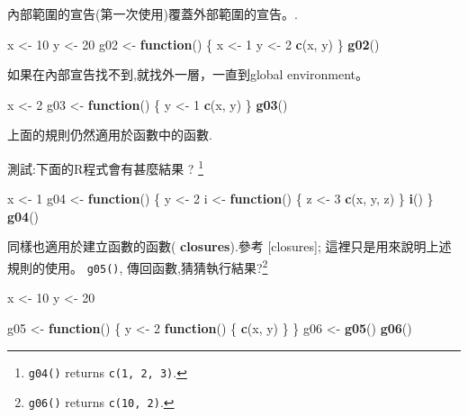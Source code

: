 \documentclass[]{book}
\newenvironment{Shaded}{\begin{snugshade}}{\end{snugshade}}
\newcommand{\ControlFlowTok}[1]{\textcolor[rgb]{0.13,0.29,0.53}{\textbf{#1}}}
\newcommand{\DecValTok}[1]{\textcolor[rgb]{0.00,0.00,0.81}{#1}}
\newcommand{\KeywordTok}[1]{\textcolor[rgb]{0.13,0.29,0.53}{\textbf{#1}}}
\newcommand{\NormalTok}[1]{#1}
\newcommand{\StringTok}[1]{\textcolor[rgb]{0.31,0.60,0.02}{#1}}
\let\rmarkdownfootnote\footnote%
\def\footnote{\protect\rmarkdownfootnote}
\theoremstyle{definition}
\theoremstyle{definition}
\theoremstyle{definition}
\theoremstyle{remark}
\begin{document}
內部範圍的宣告(第一次使用)覆蓋外部範圍的宣告。.

\begin{Shaded}
\begin{Highlighting}[]
\NormalTok{x <-}\StringTok{ }\DecValTok{10}
\NormalTok{y <-}\StringTok{ }\DecValTok{20}
\NormalTok{g02 <-}\StringTok{ }\ControlFlowTok{function}\NormalTok{() \{}
\NormalTok{  x <-}\StringTok{ }\DecValTok{1}
\NormalTok{  y <-}\StringTok{ }\DecValTok{2}
  \KeywordTok{c}\NormalTok{(x, y)}
\NormalTok{\}}
\KeywordTok{g02}\NormalTok{()}
\end{Highlighting}
\end{Shaded}

如果在內部宣告找不到,就找外一層，一直到global environment。

\begin{Shaded}
\begin{Highlighting}[]
\NormalTok{x <-}\StringTok{ }\DecValTok{2}
\NormalTok{g03 <-}\StringTok{ }\ControlFlowTok{function}\NormalTok{() \{}
\NormalTok{  y <-}\StringTok{ }\DecValTok{1}
  \KeywordTok{c}\NormalTok{(x, y)}
\NormalTok{\}}
\KeywordTok{g03}\NormalTok{()}
\end{Highlighting}
\end{Shaded}

上面的規則仍然適用於函數中的函數.

測試:下面的R程式會有甚麼結果 ? \footnote{\texttt{g04()} returns
  \texttt{c(1,\ 2,\ 3)}.}

\begin{Shaded}
\begin{Highlighting}[]
\NormalTok{x <-}\StringTok{ }\DecValTok{1}
\NormalTok{g04 <-}\StringTok{ }\ControlFlowTok{function}\NormalTok{() \{}
\NormalTok{  y <-}\StringTok{ }\DecValTok{2}
\NormalTok{  i <-}\StringTok{ }\ControlFlowTok{function}\NormalTok{() \{}
\NormalTok{    z <-}\StringTok{ }\DecValTok{3}
    \KeywordTok{c}\NormalTok{(x, y, z)}
\NormalTok{  \}}
  \KeywordTok{i}\NormalTok{()}
\NormalTok{\}}
\KeywordTok{g04}\NormalTok{()}
\end{Highlighting}
\end{Shaded}

同樣也適用於建立函數的函數( \textbf{closures}).參考 {[}closures{]};
這裡只是用來說明上述規則的使用。 \texttt{g05()},
傳回函數,猜猜執行結果?\footnote{\texttt{g06()} returns
  \texttt{c(10,\ 2)}.}

\begin{Shaded}
\begin{Highlighting}[]
\NormalTok{x <-}\StringTok{ }\DecValTok{10}
\NormalTok{y <-}\StringTok{ }\DecValTok{20}

\NormalTok{g05 <-}\StringTok{ }\ControlFlowTok{function}\NormalTok{() \{}
\NormalTok{  y <-}\StringTok{ }\DecValTok{2}
  \ControlFlowTok{function}\NormalTok{() \{}
    \KeywordTok{c}\NormalTok{(x, y)}
\NormalTok{  \}}
\NormalTok{\}}
\NormalTok{g06 <-}\StringTok{ }\KeywordTok{g05}\NormalTok{()}
\KeywordTok{g06}\NormalTok{()}
\end{Highlighting}
\end{Shaded}
\end{document}
